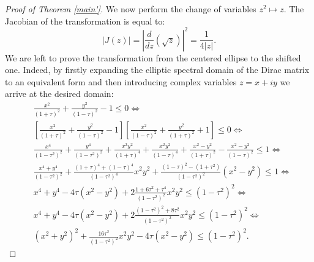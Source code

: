 \documentclass[10pt,a4paper]{amsart}
\newcommand{\beq}{\begin{equation}}
\newcommand{\eeq}{\end{equation}}
\begin{document}
\begin{proof}[Proof of Theorem \ref{main'}]
We now perform the change of variables $z^2 \mapsto z.$ The Jacobian of the transformation is equal to:
\beq \label{Jacob}
|J(z)| = \left | \frac{d}{dz} (\sqrt{z}) \right |^2 = \frac{1}{4|z|} .
\eeq
We are left to prove the transformation from the centered ellipse to the shifted one. Indeed, by firstly expanding the elliptic spectral domain of the Dirac matrix to an equivalent form and then introducing complex variables $z=x+iy$ we arrive at the desired domain:
%
\begin{align*}
    &\frac{x^2}{(1+\tau)^2} + \frac{y^2}{(1-\tau)^2} - 1 \leq 0 \Leftrightarrow \\
    &\left [ \frac{x^2}{(1+\tau)^2} + \frac{y^2}{(1-\tau)^2} - 1 \right ] \left [ \frac{x^2}{(1-\tau)^2} + \frac{y^2}{(1+\tau)^2} + 1 \right ] \leq 0 \Leftrightarrow \\
    &\frac{x^4}{(1-\tau^2)^2} + \frac{y^4}{(1-\tau^2)^2} + \frac{x^2 y^2}{(1+\tau)^4} + \frac{x^2y^2}{(1-\tau)^4} + \frac{x^2 - y^2}{(1+\tau)^2} - \frac{x^2-y^2}{(1-\tau)^2} \leq 1 \Leftrightarrow \\
    &\frac{x^4+y^4}{(1-\tau^2)^2} + \frac{(1+\tau)^4+(1-\tau)^4}{(1-\tau^2)^4}x^2y^2 + \frac{(1-\tau)^2 - (1+\tau^2)}{(1-\tau^2)^2} (x^2-y^2) \leq 1 \Leftrightarrow \\
    &x^4+y^4 - 4\tau(x^2-y^2) + 2\frac{1+6\tau^2 +\tau^4}{(1-\tau^2)^2}x^2y^2 \leq (1-\tau^2)^2 \Leftrightarrow \\
    &x^4+y^4 - 4\tau (x^2-y^2) + 2\frac{(1-\tau^2)^2 + 8\tau^2}{(1-\tau^2)^2}x^2y^2 \leq (1-\tau^2)^2 \Leftrightarrow \\
    &(x^2+y^2)^2 + \frac{16\tau^2}{(1-\tau^2)^2}x^2y^2 - 4\tau(x^2-y^2) \leq (1-\tau^2)^2 .
\end{align*}
%
\pagebreak


\end{proof}
\end{document}
